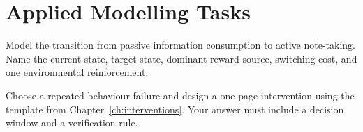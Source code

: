 \section{Applied Modelling Tasks}

\begin{exercisebox}
\begin{exercise}
Model the transition from passive information consumption to active note-taking.
Name the current state, target state, dominant reward source, switching cost,
and one environmental reinforcement.
\end{exercise}

\begin{exercise}
Choose a repeated behaviour failure and design a one-page intervention using
the template from Chapter~\ref{ch:interventions}. Your answer must include a
decision window and a verification rule.
\end{exercise}
\end{exercisebox}

